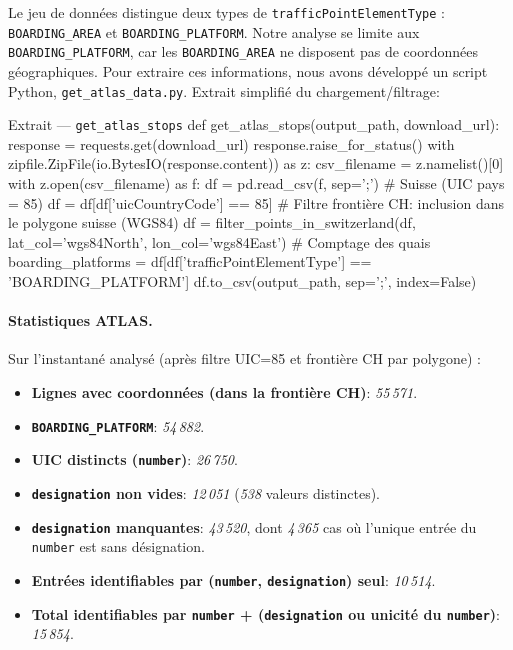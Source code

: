 Le jeu de données distingue deux types de \texttt{trafficPointElementType} : \texttt{BOARDING\_AREA} et \texttt{BOARDING\_PLATFORM}. Notre analyse se limite aux \texttt{BOARDING\_PLATFORM}, car les \texttt{BOARDING\_AREA} ne disposent pas de coordonnées géographiques. Pour extraire ces informations, nous avons développé un script Python, \texttt{get\_atlas\_data.py}. Extrait simplifié du chargement/filtrage:

\begin{codebox}[language=Python]{Extrait — \texttt{get\_atlas\_stops}}
def get_atlas_stops(output_path, download_url):
    response = requests.get(download_url)
    response.raise_for_status()
    with zipfile.ZipFile(io.BytesIO(response.content)) as z:
        csv_filename = z.namelist()[0]
        with z.open(csv_filename) as f:
            df = pd.read_csv(f, sep=';')
            # Suisse (UIC pays = 85)
            df = df[df['uicCountryCode'] == 85]
            # Filtre frontière CH: inclusion dans le polygone suisse (WGS84)
            df = filter_points_in_switzerland(df, lat_col='wgs84North', lon_col='wgs84East')
            # Comptage des quais
            boarding_platforms = df[df['trafficPointElementType'] == 'BOARDING_PLATFORM']
            df.to_csv(output_path, sep=';', index=False)
\end{codebox}


\paragraph{Statistiques ATLAS.} Sur l'instantané analysé (après filtre UIC=85 et frontière CH par polygone) :
\begin{itemize}
  \item \textbf{Lignes avec coordonnées (dans la frontière CH)}: \textit{55\,571}.
  \item \textbf{\texttt{BOARDING\_PLATFORM}}: \textit{54\,882}.
  \item \textbf{UIC distincts (\texttt{number})}: \textit{26\,750}.
  \item \textbf{\texttt{designation} non vides}: \textit{12\,051} (\textit{538} valeurs distinctes).
  \item \textbf{\texttt{designation} manquantes}: \textit{43\,520}, dont \textit{4\,365} cas où l'unique entrée du \texttt{number} est sans désignation.
  \item \textbf{Entrées identifiables par (\texttt{number}, \texttt{designation}) seul}: \textit{10\,514}.
  \item \textbf{Total identifiables par \texttt{number} + (\texttt{designation} ou unicité du \texttt{number})}: \textit{15\,854}.
\end{itemize}

